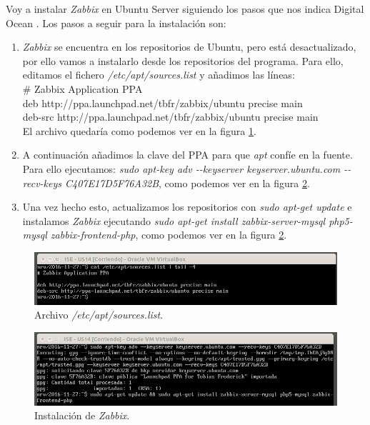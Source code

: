 \documentclass[a4paper,titlepage,12pt]{report}	%
\numberwithin{figure}{section} %
\numberwithin{table}{section} %
\begin{document}
	Voy a instalar \textit{Zabbix} en Ubuntu Server siguiendo los pasos que nos indica Digital Ocean \cite{zabbix}. Los pasos a seguir para la instalación son: \label{P3-pasos_zabbix}
	\begin{enumerate}
	   \item \textit{Zabbix} se encuentra en los repositorios de Ubuntu, pero está desactualizado, por ello vamos a instalarlo desde los repositorios del programa. Para ello, editamos el fichero \textit{/etc/apt/sources.list} y añadimos las líneas: \\

	   \# Zabbix Application PPA \\
	   deb http://ppa.launchpad.net/tbfr/zabbix/ubuntu precise main \\
	   deb-src http://ppa.launchpad.net/tbfr/zabbix/ubuntu precise main \\

	   El archivo quedaría como podemos ver en la figura \ref{P3-O4-1}.
	   \item A continuación añadimos la clave del PPA para que \textit{apt} confíe en la fuente. Para ello ejecutamos: \textit{sudo apt-key adv -{-}keyserver keyserver.ubuntu.com -{-}recv-keys C407E17D5F76A32B}, como podemos ver en la figura \ref{P3-O4-2}.
	   \item Una vez hecho esto, actualizamos los repositorios con \textit{sudo apt-get update} e instalamos \textit{Zabbix} ejecutando \textit{sudo apt-get install zabbix-server-mysql php5-mysql zabbix-frontend-php}, como podemos ver en la figura \ref{P3-O4-2}.
	\end{enumerate}

	\begin{figure}[H]
	   \includegraphics[width=\linewidth]{./Imagenes/P3/O4-1.png}
	   \vspace{-0.5cm}
	   \caption[Archivo \textit{/etc/apt/sources.list}.]{Archivo \textit{/etc/apt/sources.list}.}
	   \label{P3-O4-1}
	\end{figure}

	\begin{figure}[H]
	   \includegraphics[width=\linewidth]{./Imagenes/P3/O4-2.png}
	   \vspace{-0.5cm}
	   \caption[Instalación de \textit{Zabbix}.]{Instalación de \textit{Zabbix}.}
	   \label{P3-O4-2}
	\end{figure}
\end{document}
